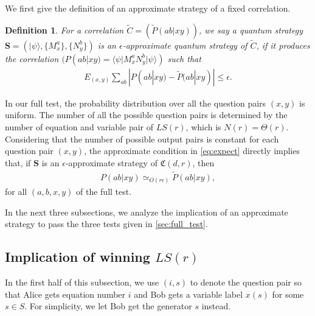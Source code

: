 \documentclass[11pt,letterpaper]{article}
\newcommand{\ket}[1]{|#1\rangle}
\newcommand{\bra}[1]{\langle#1|}
\newcommand{\1}{\mathbb{1}}
\newcommand{\LS}{LS}
\newcommand{\fC}{\mathfrak{C}}
\newcommand{\bS}{\pmb{S}}
\newcommand{\pr}[2]{P(#1|#2)}
\newcommand{\tpr}[2]{\tilde{P}(#1|#2)}
\newcommand{\ep}{\epsilon}
\newcommand{\appd}[1]{\simeq_{#1}}
\newtheorem{definition}[theorem]{Definition}
\theoremstyle{definition}
\begin{document}
We first give the definition of an approximate strategy of a fixed correlation.
\begin{definition}
	For a correlation $\tilde{C} = (\tpr{ab}{xy})$,
	we say a quantum strategy $\bS = (\ket{\psi}, \{M_x^a\}, \{N_y^b\})$
	is an $\ep$-approximate quantum strategy of $\tilde{C}$, 
	if it produces the correlation
	$( \pr{ab}{xy} = \bra{\psi} M_x^a N_y^b \ket{\psi} )$ such that
	\begin{align}
	\label{eq:expect}
	E_{(x,y)} \sum_{ab} |\pr{ab}{xy} - \tpr{ab}{xy}| \leq \ep.
	\end{align}
\end{definition}
In our full test, the probability distribution over all the question pairs $(x,y)$ is uniform.
The number of all the possible question pairs is determined by
the number of equation and variable pair of $\LS(r)$, which is
$N(r) = \Theta(r)$.
Considering that
the number of possible output pairs is constant for each question pair $(x,y)$, 
the approximate condition in \cref{eq:expect} directly implies that, if $\bS$ is an $\ep$-approximate strategy
of $\fC(d,r)$, then
\begin{align*}
    \pr{ab}{xy} \appd{O(r\ep)} \tpr{ab}{xy},
\end{align*}
for all $(a,b,x,y)$ of the full test.

In the next three subsections, we analyze the implication of an approximate strategy to pass the 
three tests given in \cref{sec:full_test}.

\subsection{Implication of winning $\LS(r)$}
\label{sec:imp_lct}
In the first half of this subsection, we use $(i,s)$ to denote the question pair so that Alice gets equation number $i$ and Bob gets a variable label $x(s)$ for some $s \in S$. For simplicity, we let Bob get the generator $s$ instead. 
\end{document}
